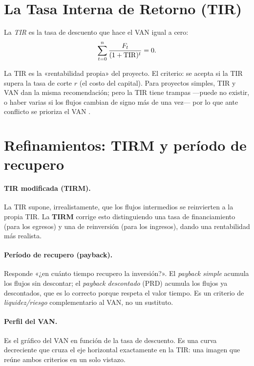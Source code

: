 \section{La Tasa Interna de Retorno (TIR)}

\begin{definicion}
La \emph{TIR} es la tasa de descuento que hace el VAN igual a cero:
\[
\sum_{t=0}^{n}\frac{F_t}{(1+\mathrm{TIR})^{t}} = 0 .
\]
\end{definicion}

La TIR es la «rentabilidad propia» del proyecto. El criterio: se acepta si la TIR supera la tasa de corte $r$ (el costo del capital). Para proyectos simples, TIR y VAN dan la misma recomendación; pero la TIR tiene trampas —puede no existir, o haber varias si los flujos cambian de signo más de una vez— por lo que ante conflicto se prioriza el VAN \cite{sapag}.

\section{Refinamientos: TIRM y período de recupero}

\paragraph{TIR modificada (TIRM).} La TIR supone, irrealistamente, que los flujos intermedios se reinvierten a la propia TIR. La \textbf{TIRM} corrige esto distinguiendo una tasa de financiamiento (para los egresos) y una de reinversión (para los ingresos), dando una rentabilidad más realista.

\paragraph{Período de recupero (payback).} Responde «¿en cuánto tiempo recupero la inversión?». El \emph{payback simple} acumula los flujos sin descontar; el \emph{payback descontado} (PRD) acumula los flujos ya descontados, que es lo correcto porque respeta el valor tiempo. Es un criterio de \emph{liquidez/riesgo} complementario al VAN, no un sustituto.

\paragraph{Perfil del VAN.} Es el gráfico del VAN en función de la tasa de descuento. Es una curva decreciente que cruza el eje horizontal exactamente en la TIR: una imagen que reúne ambos criterios en un solo vistazo.

